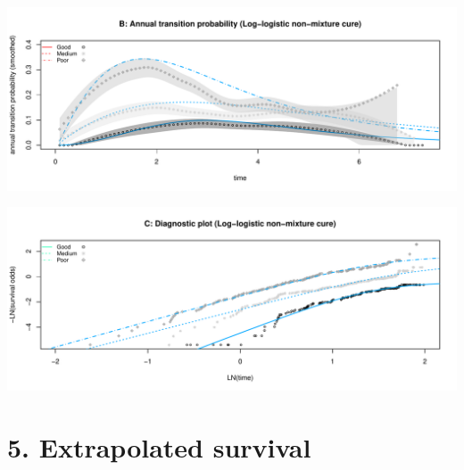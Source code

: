 \documentclass[
]{article}
\begin{document}
\begin{flushleft}\includegraphics[height=0.25\textheight]{Images/cure_llog_nmix-2} \end{flushleft}

\begin{flushleft}\includegraphics[height=0.25\textheight]{Images/cure_llog_nmix-3} \end{flushleft}

\clearpage

\hypertarget{extrapolated-survival}{%
\section{5. Extrapolated survival}\label{extrapolated-survival}}
\end{document}
